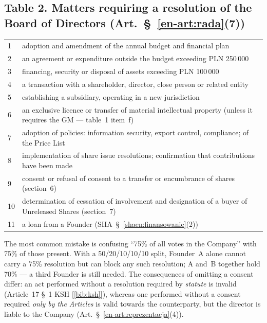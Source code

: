 \documentclass[11pt,a4paper]{report}
\newcommand{\Zr}[1]{[\ref{bib:#1}]}
\begin{document}
\subsection*{Table 2. Matters requiring a resolution of the Board of Directors (Art.~\S~\ref{en-art:rada}(7))}
\begin{tabularx}{\linewidth}{@{}p{0.6cm} X@{}}
\toprule
1 & adoption and amendment of the annual budget and financial plan \\
2 & an agreement or expenditure outside the budget exceeding PLN 250\,000 \\
3 & financing, security or disposal of assets exceeding PLN 100\,000 \\
4 & a transaction with a shareholder, director, close person or related entity \\
5 & establishing a subsidiary, operating in a new jurisdiction \\
6 & an exclusive licence or transfer of material intellectual property (unless it requires the GM --- table~1 item~f) \\
7 & adoption of policies: information security, export control, compliance; of the Price List \\
8 & implementation of share issue resolutions; confirmation that contributions have been made \\
9 & consent or refusal of consent to a transfer or encumbrance of shares (section~6) \\
10 & determination of cessation of involvement and designation of a buyer of Unreleased Shares (section~7) \\
11 & a loan from a Founder (SHA~\S~\ref{shaen:finansowanie}(2)) \\
\bottomrule
\end{tabularx}

\begin{Komentarz}
The most common mistake is confusing ``75\% of all votes in the Company'' with 75\% of those present. With a 50/20/10/10/10 split, Founder~A alone cannot carry a 75\% resolution but can block any such resolution; A and~B together hold 70\% --- a third Founder is still needed. The consequences of omitting a consent differ: an act performed without a resolution required by \emph{statute} is invalid (Article~17 \S~1 KSH \Zr{ksh}), whereas one performed without a consent required \emph{only by the Articles} is valid towards the counterparty, but the director is liable to the Company (Art.~\S~\ref{en-art:reprezentacja}(4)).
\end{Komentarz}
\end{document}

